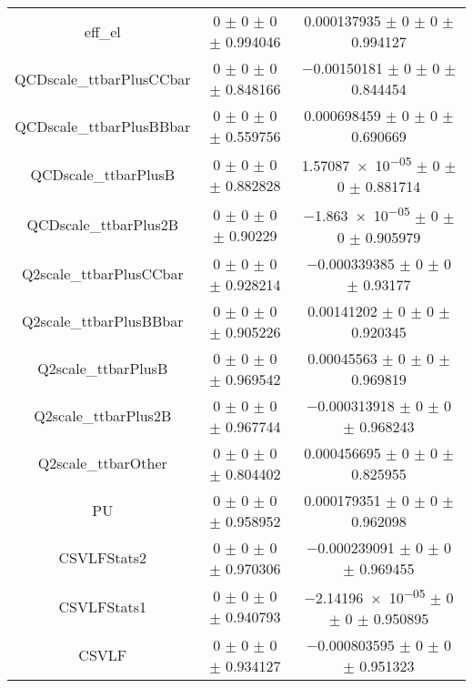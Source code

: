 \begin{table}
\begin{tabular}{ccc}
eff\_el 	& \num{0} $\pm$ \num{0} $\pm$ \num{0} $\pm$ \num{0.994046} 	& \num{0.000137935} $\pm$ \num{0} $\pm$ \num{0} $\pm$ \num{0.994127}\\
QCDscale\_ttbarPlusCCbar 	& \num{0} $\pm$ \num{0} $\pm$ \num{0} $\pm$ \num{0.848166} 	& \num{-0.00150181} $\pm$ \num{0} $\pm$ \num{0} $\pm$ \num{0.844454}\\
QCDscale\_ttbarPlusBBbar 	& \num{0} $\pm$ \num{0} $\pm$ \num{0} $\pm$ \num{0.559756} 	& \num{0.000698459} $\pm$ \num{0} $\pm$ \num{0} $\pm$ \num{0.690669}\\
QCDscale\_ttbarPlusB 	& \num{0} $\pm$ \num{0} $\pm$ \num{0} $\pm$ \num{0.882828} 	& \num{1.57087e-05} $\pm$ \num{0} $\pm$ \num{0} $\pm$ \num{0.881714}\\
QCDscale\_ttbarPlus2B 	& \num{0} $\pm$ \num{0} $\pm$ \num{0} $\pm$ \num{0.90229} 	& \num{-1.863e-05} $\pm$ \num{0} $\pm$ \num{0} $\pm$ \num{0.905979}\\
Q2scale\_ttbarPlusCCbar 	& \num{0} $\pm$ \num{0} $\pm$ \num{0} $\pm$ \num{0.928214} 	& \num{-0.000339385} $\pm$ \num{0} $\pm$ \num{0} $\pm$ \num{0.93177}\\
Q2scale\_ttbarPlusBBbar 	& \num{0} $\pm$ \num{0} $\pm$ \num{0} $\pm$ \num{0.905226} 	& \num{0.00141202} $\pm$ \num{0} $\pm$ \num{0} $\pm$ \num{0.920345}\\
Q2scale\_ttbarPlusB 	& \num{0} $\pm$ \num{0} $\pm$ \num{0} $\pm$ \num{0.969542} 	& \num{0.00045563} $\pm$ \num{0} $\pm$ \num{0} $\pm$ \num{0.969819}\\
Q2scale\_ttbarPlus2B 	& \num{0} $\pm$ \num{0} $\pm$ \num{0} $\pm$ \num{0.967744} 	& \num{-0.000313918} $\pm$ \num{0} $\pm$ \num{0} $\pm$ \num{0.968243}\\
Q2scale\_ttbarOther 	& \num{0} $\pm$ \num{0} $\pm$ \num{0} $\pm$ \num{0.804402} 	& \num{0.000456695} $\pm$ \num{0} $\pm$ \num{0} $\pm$ \num{0.825955}\\
PU 	& \num{0} $\pm$ \num{0} $\pm$ \num{0} $\pm$ \num{0.958952} 	& \num{0.000179351} $\pm$ \num{0} $\pm$ \num{0} $\pm$ \num{0.962098}\\
CSVLFStats2 	& \num{0} $\pm$ \num{0} $\pm$ \num{0} $\pm$ \num{0.970306} 	& \num{-0.000239091} $\pm$ \num{0} $\pm$ \num{0} $\pm$ \num{0.969455}\\
CSVLFStats1 	& \num{0} $\pm$ \num{0} $\pm$ \num{0} $\pm$ \num{0.940793} 	& \num{-2.14196e-05} $\pm$ \num{0} $\pm$ \num{0} $\pm$ \num{0.950895}\\
CSVLF 	& \num{0} $\pm$ \num{0} $\pm$ \num{0} $\pm$ \num{0.934127} 	& \num{-0.000803595} $\pm$ \num{0} $\pm$ \num{0} $\pm$ \num{0.951323}\\

\end{tabular}
\end{table}
